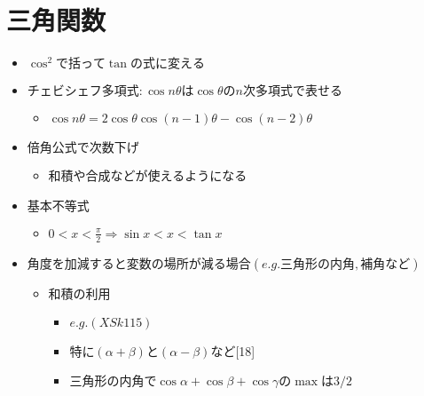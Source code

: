 \documentclass[dvipdfmx,uplatex]{jsarticle}
\begin{document}
\section{三角関数}
\begin{itemize}
	\item $ \cos^{2} で括って \tan の式に変える$
	\item $ チェビシェフ多項式: \cos nθ は \cos θ の n 次多項式で表せる$
	\begin{itemize}
		\item $\cos n\theta = 2\cos \theta \cos (n-1)\theta - \cos (n-2)\theta$
	\end{itemize}
	\item $ 倍角公式で次数下げ$
	\begin{itemize}
		\item 和積や合成などが使えるようになる
	\end{itemize}
	\item $ 基本不等式$
	\begin{itemize}
		\item $ 0 < x < \frac{ \pi }{2} \Rightarrow \sin x < x < \tan x$
	\end{itemize}
	\item $ 角度を加減すると変数の場所が減る場合(e.g.三角形の内角,補角など)$
	\begin{itemize}
		\item $ 和積の利用$
		\begin{itemize}
			\item $ e.g. (XSk115)$
			\item 特に$( \alpha + \beta )と( \alpha - \beta )$など[18]
			\item $三角形の内角で \cos \alpha + \cos \beta + \cos \gamma の \max は3/2$
		\end{itemize}
	\end{itemize}
\end{itemize}
\end{document}
